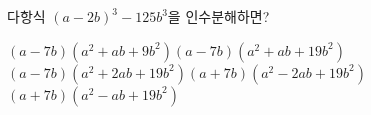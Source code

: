 다항식 $(a-2b)^3-125b^3$을 인수분해하면?
\begin{choicesv}{$(a-7b)(a^2+ab+9b^2)$}{$(a-7b)(a^2+ab+19b^2)$}{$(a-7b)(a^2+2ab+19b^2)$}{$(a+7b)(a^2-2ab+19b^2)$}{$(a+7b)(a^2-ab+19b^2)$}\end{choicesv}
